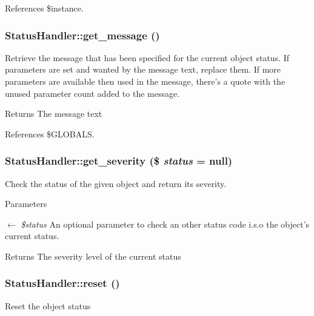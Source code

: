 References \$instance.

\subsubsection[{get\_\-message}]{\setlength{\rightskip}{0pt plus 5cm}StatusHandler::get\_\-message ()}\label{classStatusHandler_a79170bca79bfd82e3f707e1294e7c916}
Retrieve the message that has been specified for the current object status. If parameters are set and wanted by the message text, replace them. If more parameters are available then used in the message, there's a quote with the unused parameter count added to the message.

\begin{DoxyReturn}{Returns}
The message text 
\end{DoxyReturn}


References \$GLOBALS.

\subsubsection[{get\_\-severity}]{\setlength{\rightskip}{0pt plus 5cm}StatusHandler::get\_\-severity (\$ {\em status} = {\ttfamily null})}\label{classStatusHandler_acadd0806c17eb02abcc92882e8588d4e}
Check the status of the given object and return its severity.


\begin{DoxyParams}{Parameters}
\item[\mbox{$\leftarrow$} {\em \$status}]An optional parameter to check an other status code i.s.o the object's current status. \end{DoxyParams}
\begin{DoxyReturn}{Returns}
The severity level of the current status 
\end{DoxyReturn}
\subsubsection[{reset}]{\setlength{\rightskip}{0pt plus 5cm}StatusHandler::reset ()}\label{classStatusHandler_a8b0a327d3272ae49032a596518d47164}
Reset the object status 
